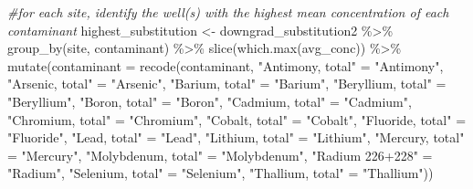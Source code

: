 \documentclass[12pt, twoside]{amherstthesis}
\newenvironment{Shaded}{\begin{snugshade}}{\end{snugshade}}
\newcommand{\AttributeTok}[1]{\textcolor[rgb]{0.77,0.63,0.00}{#1}}
\newcommand{\CommentTok}[1]{\textcolor[rgb]{0.56,0.35,0.01}{\textit{#1}}}
\newcommand{\FunctionTok}[1]{\textcolor[rgb]{0.00,0.00,0.00}{#1}}
\newcommand{\NormalTok}[1]{#1}
\newcommand{\OtherTok}[1]{\textcolor[rgb]{0.56,0.35,0.01}{#1}}
\newcommand{\SpecialCharTok}[1]{\textcolor[rgb]{0.00,0.00,0.00}{#1}}
\newcommand{\StringTok}[1]{\textcolor[rgb]{0.31,0.60,0.02}{#1}}
\begin{document}
\begin{Shaded}
\begin{Highlighting}[]
\CommentTok{\#for each site, identify the well(s) with the highest mean concentration of each contaminant}
\NormalTok{highest\_substitution }\OtherTok{\textless{}{-}}\NormalTok{ downgrad\_substitution2 }\SpecialCharTok{\%\textgreater{}\%}
  \FunctionTok{group\_by}\NormalTok{(site, contaminant) }\SpecialCharTok{\%\textgreater{}\%}
  \FunctionTok{slice}\NormalTok{(}\FunctionTok{which.max}\NormalTok{(avg\_conc)) }\SpecialCharTok{\%\textgreater{}\%}
  \FunctionTok{mutate}\NormalTok{(}\AttributeTok{contaminant =} \FunctionTok{recode}\NormalTok{(contaminant,}
                              \StringTok{"Antimony, total"} \OtherTok{=} \StringTok{"Antimony"}\NormalTok{,}
                              \StringTok{"Arsenic, total"} \OtherTok{=} \StringTok{"Arsenic"}\NormalTok{,}
                              \StringTok{"Barium, total"} \OtherTok{=} \StringTok{"Barium"}\NormalTok{,}
                              \StringTok{"Beryllium, total"} \OtherTok{=} \StringTok{"Beryllium"}\NormalTok{,}
                              \StringTok{"Boron, total"} \OtherTok{=} \StringTok{"Boron"}\NormalTok{,}
                              \StringTok{"Cadmium, total"} \OtherTok{=} \StringTok{"Cadmium"}\NormalTok{,}
                              \StringTok{"Chromium, total"} \OtherTok{=} \StringTok{"Chromium"}\NormalTok{,}
                              \StringTok{"Cobalt, total"} \OtherTok{=} \StringTok{"Cobalt"}\NormalTok{,}
                              \StringTok{"Fluoride, total"} \OtherTok{=} \StringTok{"Fluoride"}\NormalTok{,}
                              \StringTok{"Lead, total"} \OtherTok{=} \StringTok{"Lead"}\NormalTok{,}
                              \StringTok{"Lithium, total"} \OtherTok{=} \StringTok{"Lithium"}\NormalTok{,}
                              \StringTok{"Mercury, total"} \OtherTok{=} \StringTok{"Mercury"}\NormalTok{,}
                              \StringTok{"Molybdenum, total"} \OtherTok{=} \StringTok{"Molybdenum"}\NormalTok{,}
                              \StringTok{"Radium 226+228"} \OtherTok{=} \StringTok{"Radium"}\NormalTok{,}
                              \StringTok{"Selenium, total"} \OtherTok{=} \StringTok{"Selenium"}\NormalTok{,}
                              \StringTok{"Thallium, total"} \OtherTok{=} \StringTok{"Thallium"}\NormalTok{))}


\end{Highlighting}
\end{Shaded}
\end{document}
